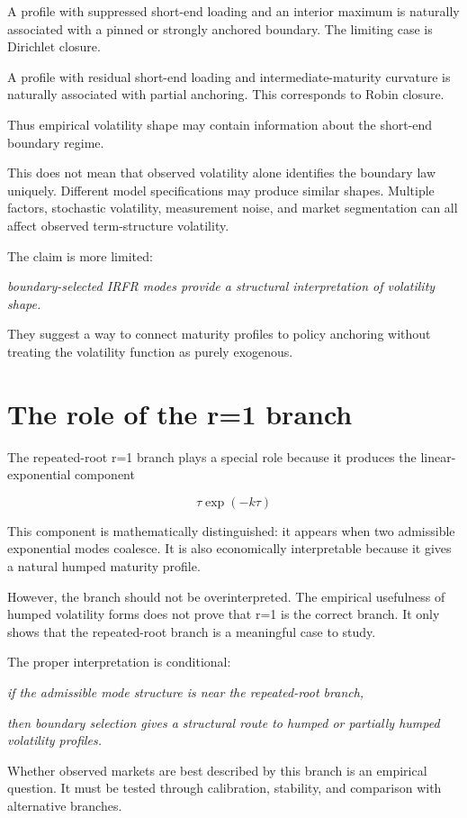 \documentclass[11pt,oneside]{book}
\begin{document}
A profile with suppressed short-end loading and an interior maximum is
naturally associated with a pinned or strongly anchored boundary. The
limiting case is Dirichlet closure.

A profile with residual short-end loading and intermediate-maturity
curvature is naturally associated with partial anchoring. This
corresponds to Robin closure.

Thus empirical volatility shape may contain information about the
short-end boundary regime.

This does not mean that observed volatility alone identifies the
boundary law uniquely. Different model specifications may produce
similar shapes. Multiple factors, stochastic volatility, measurement
noise, and market segmentation can all affect observed term-structure
volatility.

The claim is more limited:

\emph{boundary-selected IRFR modes provide a structural interpretation
of volatility shape.}

They suggest a way to connect maturity profiles to policy anchoring
without treating the volatility function as purely exogenous.

\section{The role of the r=1
branch}\label{the-role-of-the-r1-branch}

The repeated-root r=1 branch plays a special role because it produces
the linear-exponential component

\[
\tau \exp(-k\tau)
\]

This component is mathematically distinguished: it appears when two
admissible exponential modes coalesce. It is also economically
interpretable because it gives a natural humped maturity profile.

However, the branch should not be overinterpreted. The empirical
usefulness of humped volatility forms does not prove that r=1 is the
correct branch. It only shows that the repeated-root branch is a
meaningful case to study.

The proper interpretation is conditional:

\emph{if the admissible mode structure is near the repeated-root
branch,}

\emph{then boundary selection gives a structural route to humped or
partially humped volatility profiles.}

Whether observed markets are best described by this branch is an
empirical question. It must be tested through calibration, stability,
and comparison with alternative branches.
\end{document}
